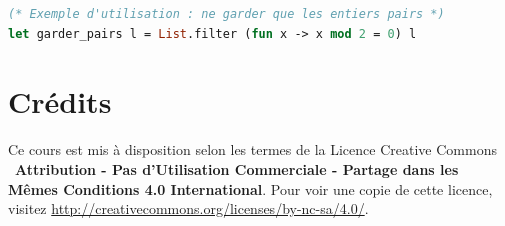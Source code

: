 \documentclass{article}
\begin{document}
\begin{lstlisting}[language=Caml]
(* Exemple d'utilisation : ne garder que les entiers pairs *)
let garder_pairs l = List.filter (fun x -> x mod 2 = 0) l
\end{lstlisting}


\noindent{}

\newpage
\tableofcontents

\section*{Crédits}
Ce cours est mis à disposition selon les termes de la Licence Creative Commons \ccbyncsa\ \textbf{Attribution - Pas d'Utilisation Commerciale - Partage dans les Mêmes Conditions 4.0 International}. 
Pour voir une copie de cette licence, visitez \url{http://creativecommons.org/licenses/by-nc-sa/4.0/}.
\end{document}

